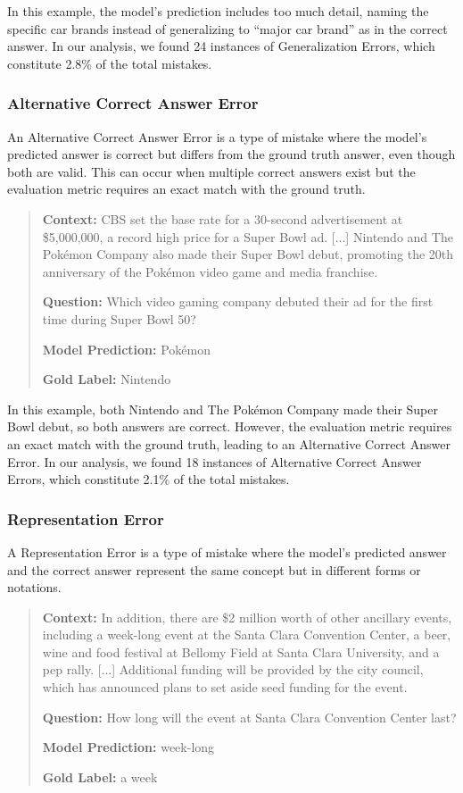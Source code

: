 \documentclass{article}
\begin{document}
In this example, the model's prediction includes too much detail, naming the
specific car brands instead of generalizing to ``major car brand''
as in the correct answer. In our analysis, we found 24 instances of
Generalization Errors, which constitute 2.8\% of the total mistakes.

\subsubsection*{Alternative Correct Answer Error}

An Alternative Correct Answer Error is a type of mistake where the model's
predicted answer is correct but differs from the ground truth answer, even
though both are valid. This can occur when multiple correct answers exist but
the evaluation metric requires an exact match with the ground truth.

\begin{quote}
\textbf{Context:} CBS set the base rate for a 30-second advertisement at
\$5,000,000, a record high price for a Super Bowl ad. [...] Nintendo and The
Pokémon Company also made their Super Bowl debut, promoting the 20th
anniversary of the Pokémon video game and media franchise.

\textbf{Question:} Which video gaming company debuted their ad for the first
time during Super Bowl 50?

\textbf{Model Prediction:} Pokémon

\textbf{Gold Label:} Nintendo
\end{quote}

In this example, both Nintendo and The Pokémon Company made their Super Bowl
debut, so both answers are correct. However, the evaluation metric requires an
exact match with the ground truth, leading to an Alternative Correct Answer
Error. In our analysis, we found 18 instances of
Alternative Correct Answer Errors, which constitute 2.1\% of the total mistakes.

\subsubsection*{Representation Error}

A Representation Error is a type of mistake where the model's predicted answer
and the correct answer represent the same concept but in different forms or
notations.

\begin{quote}
\textbf{Context:} In addition, there are \$2 million worth of other ancillary
events, including a week-long event at the Santa Clara Convention Center, a
beer, wine and food festival at Bellomy Field at Santa Clara University, and a
pep rally. [...] Additional funding will be provided by the city council, which
has announced plans to set aside seed funding for the event.

\textbf{Question:} How long will the event at Santa Clara Convention Center last?

\textbf{Model Prediction:} week-long

\textbf{Gold Label:} a week
\end{quote}
\end{document}
